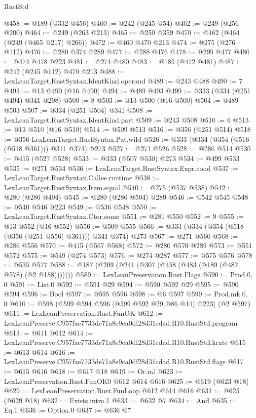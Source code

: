 \begin{lexlean}{RustStd}
\begin{coremodule}
@458 := @189 (@332 @456)
@460 := @242 (@245 @54)
@462 := @249 (@256 @200)
@464 := @249 (@263 @213)
@465 := @250 @359
@470 := @462 (@464 (@249 (@465 @217) @266))
@472 := @460 @470 @213
@474 := @275 (@276 @112)
@476 := @280 @374 @289
@477 := @288 @476
@478 := @299 @477
@480 := @474 @478 @223
@481 := @274 @480
@483 := @189 (@472 @481)
@487 := @242 (@245 @112) @470 @213
@488 := LexLeanTarget.RustSyntax.IdentKind.operand
@489 := @243 @488
@490 := 7
@493 := @13 @490 (@16 @490)
@494 := @489 @493
@499 := @333 (@334 (@251 @494) @341 @298)
@500 := 8
@503 := @13 @500 (@16 @500)
@504 := @489 @503
@507 := @334 (@251 @504) @341
@508 := LexLeanTarget.RustSyntax.IdentKind.part
@509 := @243 @508
@510 := 6
@513 := @13 @510 (@16 @510)
@514 := @509 @513
@516 := @356 (@251 @514)
@518 := @356 LexLeanTarget.RustSyntax.Pat.wild
@526 := @333 (@334 (@354 (@516 (@518 @361))) @341 @374) @273
@527 := @271 @526
@528 := @286 @514
@530 := @415 (@527 @528)
@533 := @333 (@507 @530) @273
@534 := @499 @533
@535 := @271 @534
@536 := LexLeanTarget.RustSyntax.Expr.cond
@537 := LexLeanTarget.RustSyntax.Callee.runtime
@538 := LexLeanTarget.RustSyntax.Item.equal
@540 := @275 (@537 @538)
@542 := @280 (@286 @494)
@545 := @280 (@286 @504) @289
@546 := @542 @545
@548 := @540 @546 @223
@549 := @536 @548
@550 := LexLeanTarget.RustSyntax.Ctor.some
@551 := @281 @550
@552 := 9
@555 := @13 @552 (@16 @552)
@556 := @509 @555
@566 := @333 (@334 (@354 (@518 (@356 (@251 @556) @361))) @341 @374) @273
@567 := @271 @566
@568 := @286 @556
@570 := @415 (@567 @568)
@572 := @280 @570 @289
@573 := @551 @572
@575 := @549 (@274 @573)
@576 := @274 @287
@577 := @575 @576
@578 := @535 @577
@588 := @187 (@209 (@241 (@307 (@458 (@483 (@189 (@487 @578) (@2 @188)))))))
@589 := LexLeanPreservation.Rust.Flags
@590 := Prod.{0, 0}
@591 := List.{0}
@592 := @591 @29
@594 := @590 @592 @29
@595 := @590 @594
@596 := Bool
@597 := @595 @596
@598 := @6 @597
@599 := Prod.mk.{0, 0}
@610 := @598 (@599 @594 @596 (@599 @592 @29 @86 @44) @223) (@2 @597)
@611 := LexLeanPreservation.Rust.FunOK
@612 := LexLeanPreserve.C957fae7733de71a8e9ca0df28d31cdad.R10.RustStd.program
@613 := @611 @612
@614 := LexLeanPreserve.C957fae7733de71a8e9ca0df28d31cdad.R10.RustStd.krate
@615 := @613 @614
@616 := LexLeanPreserve.C957fae7733de71a8e9ca0df28d31cdad.R10.RustStd.flags
@617 := @615 @616
@618 := @617 @18
@619 := Or.inl
@623 := LexLeanPreservation.Rust.FunOK0 @612 @614 @616
@625 := @619 (@623 @18)
@629 := LexLeanPreservation.Rust.FunLoop @612 @614 @616
@631 := @625 (@629 @18)
@632 := Exists.intro.{1}
@633 := @632 @7
@634 := And
@635 := Eq.{1}
@636 := Option.{0}
@637 := @636 @7

\end{coremodule}
\end{lexlean}
